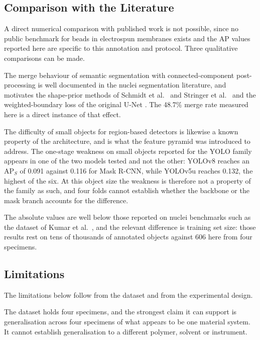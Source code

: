 \subsection{Comparison with the Literature}

A direct numerical comparison with published work is not possible, since no public
benchmark for beads in electrospun membranes exists and the AP values reported
here are specific to this annotation and protocol. Three qualitative comparisons
can be made.

The merge behaviour of semantic segmentation with connected-component
post-processing is well documented in the nuclei segmentation literature, and
motivates the shape-prior methods of Schmidt et al.\ \cite{schmidt2018stardist}
and Stringer et al.\ \cite{stringer2021cellpose} and the weighted-boundary loss of
the original U-Net \cite{ronneberger2015unet, falk2019unet}. The 48.7\% merge rate
measured here is a direct instance of that effect.

The difficulty of small objects for region-based detectors is likewise a known
property of the architecture, and is what the feature pyramid
\cite{lin2017feature} was introduced to address. The one-stage weakness on small
objects reported for the YOLO family \cite{redmon2016yolo, lin2020focal} appears
in one of the two models tested and not the other: YOLOv8 reaches an
$\mathrm{AP}_S$ of 0.091 against 0.116 for Mask R-CNN, while YOLOv5u reaches
0.132, the highest of the six. At this object size the weakness is therefore not a
property of the family as such, and four folds cannot establish whether the
backbone or the mask branch accounts for the difference.

The absolute values are well below those reported on nuclei benchmarks such as the
dataset of Kumar et al.\ \cite{kumar2017dataset}, and the relevant difference is
training set size: those results rest on tens of thousands of annotated objects
against 606 here from four specimens.

\subsection{Limitations}
\label{sec:limitations}

The limitations below follow from the dataset and from the experimental design.

The dataset holds four specimens, and the strongest claim it can support is
generalisation across four specimens of what appears to be one material system. It
cannot establish generalisation to a different polymer, solvent or instrument.

